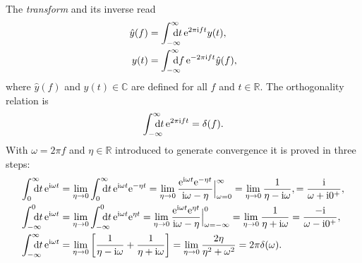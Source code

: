 The \emph{ transform} and its inverse read
%
\begin{align*}
    \hat y(f) &= \int \from{-\infty} \till \infty
    \D t \, \E^{2 \pi \I f t} y(t),
    \\
    y(t) &= \int \from{-\infty} \till \infty
    \D f \, \E^{-2 \pi \I f t} \hat y(f),
\end{align*}
%
where $\hat y(f)$ and $y(t) \in \mathds C$ are defined for all $f$ and $t \in
\mathds R$. The orthogonality relation is
%
\begin{equation*}
    \int \from{-\infty} \till \infty \D t \, \E^{2 \pi \I f t} = \delta(f).
\end{equation*}
%
With $\omega = 2 \pi f$ and $\eta \in \mathds R$ introduced to generate
convergence it is proved in three steps:
%
\begin{subequations}
    \begin{align}
        \label{int+ dt exp(i omega t)}
        \int \from 0 \till \infty \D t \, \E^{\I \omega t}
        &= \lim_{\eta \rightarrow 0}
            \int \from 0 \till \infty \D t \, \E^{\I \omega t} \E^{-\eta t}
        = \lim_{\eta \rightarrow 0}
            \frac{\E^{\I \omega t} \E^{-\eta t}}{\I \omega - \eta}
            \Big|_{\omega = 0}^\infty
        = \lim_{\eta \rightarrow 0} \frac 1 {\eta - \I \omega},
        = \frac \I {\omega + \I 0^+},
        \\
        \label{int- dt exp(i omega t)}
        \int \from{-\infty} \till 0 \D t \, \E^{\I \omega t}
        &= \lim_{\eta \rightarrow 0}
            \int \from{-\infty} \till 0 \D t \, \E^{\I \omega t} \E^{\eta t}
        = \lim_{\eta \rightarrow 0}
            \frac{\E^{\I \omega t} \E^{\eta t}}{\I \omega - \eta}
            \Big|_{\omega = -\infty}^0
        = \lim_{\eta \rightarrow 0} \frac 1 {\eta + \I \omega}
        = \frac{-\I}{\omega - \I 0^+},
        \\
        \label{int dt exp(i omega t)}
        \int \from{-\infty} \till \infty \D t \, \E^{\I \omega t}
        &= \lim_{\eta \rightarrow 0} \left[
            \frac 1 {\eta - \I \omega} + \frac 1 {\eta + \I \omega} \right]
        = \lim_{\eta \rightarrow 0} \frac{2 \eta}{\eta^2 + \omega^2}
        = 2 \pi \delta(\omega).
    \end{align}
\end{subequations}
